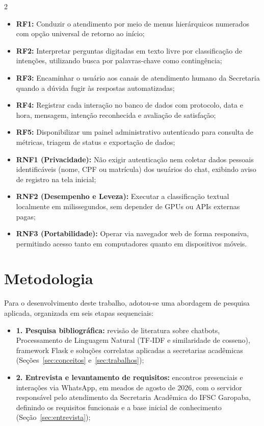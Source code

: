 \documentclass[10pt]{article}
\begin{document}
\begin{multicols}{2}
\begin{itemize}
  \item \textbf{RF1:} Conduzir o atendimento por meio de menus
  hierárquicos numerados com opção universal de retorno ao início;
  \item \textbf{RF2:} Interpretar perguntas digitadas em texto livre por
  classificação de intenções, utilizando busca por palavras-chave como
  contingência;
  \item \textbf{RF3:} Encaminhar o usuário aos canais de atendimento
  humano da Secretaria quando a dúvida fugir às respostas automatizadas;
  \item \textbf{RF4:} Registrar cada interação no banco de dados com
  protocolo, data e hora, mensagem, intenção reconhecida e avaliação de
  satisfação;
  \item \textbf{RF5:} Disponibilizar um painel administrativo autenticado
  para consulta de métricas, triagem de status e exportação de dados;
  \item \textbf{RNF1 (Privacidade):} Não exigir autenticação nem coletar
  dados pessoais identificáveis (nome, CPF ou matrícula) dos usuários do
  chat, exibindo aviso de registro na tela inicial;
  \item \textbf{RNF2 (Desempenho e Leveza):} Executar a classificação
  textual localmente em milissegundos, sem depender de GPUs ou APIs
  externas pagas;
  \item \textbf{RNF3 (Portabilidade):} Operar via navegador web de forma
  responsiva, permitindo acesso tanto em computadores quanto em
  dispositivos móveis.
\end{itemize}

\section{Metodologia}\label{sec:metodologia}

Para o desenvolvimento deste trabalho, adotou-se uma abordagem de
pesquisa aplicada, organizada em seis etapas sequenciais:

\begin{itemize}
  \item \textbf{1. Pesquisa bibliográfica:} revisão de literatura sobre
  chatbots, Processamento de Linguagem Natural (TF-IDF e similaridade de
  cosseno), framework Flask e soluções correlatas aplicadas a
  secretarias acadêmicas (Seções~\ref{sec:conceitos}
  e~\ref{sec:trabalhos});

  \item \textbf{2. Entrevista e levantamento de requisitos:} encontros
  presenciais e interações via WhatsApp, em meados de agosto de 2026,
  com o servidor responsável pelo atendimento da Secretaria Acadêmica do
  IFSC Garopaba, definindo os requisitos funcionais e a base inicial de
  conhecimento (Seção~\ref{sec:entrevista});


\end{itemize}
\end{multicols}
\end{document}
